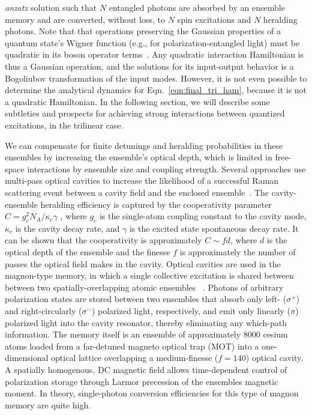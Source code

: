\documentclass[aps,twocolumn,secnumarabic,amsmath,amssymb,pra,groupedaddress,
showpacs, showkeys,draft]{revtex4-1}
\begin{document}
\emph{anzatz} solution such that $N$ entangled photons are absorbed by an
ensemble memory and are converted, without loss, to $N$ spin excitations and
$N$ heralding photons.  Note that that operations preserving the Gaussian
properties of a quantum state's Wigner function (e.g., for
polarization-entangled light) must be quadratic in its boson operator
terms~\cite{RevModPhys.77.513}. Any quadratic interaction Hamiltonian is thus a
Gaussian operation, and the solutions for its input-output behavior is a
Bogoliubov transformation of the input modes. However, it is not even possible
to determine the analytical dynamics for Eqn.~\ref{eqn:final_tri_ham}, because
it is not a quadratic Hamiltonian. In the following section, we will describe
some subtleties and prospects for achieving strong interactions between
quantized excitations, in the trilinear case.

We can compensate for finite detunings and heralding probabilities in these
ensembles by increasing the ensemble's optical depth, which is limited in
free-space interactions by ensemble size and coupling strength. Several
approaches use multi-pass optical cavities to increase the likelihood of a
successful Raman scattering event between a cavity field and the enclosed
ensemble~\cite{PhysRevLett.92.123601, PhysRevLett.95.133601,
  PhysRevLett.98.190503,Thompson07072006,PhysRevLett.98.183601}. The
cavity-ensemble heralding efficiency is captured by the cooperativity parameter
$C=g_c^2 N_A/\kappa_c \gamma$ , where $g_c$ is the single-atom coupling
constant to the cavity mode, $\kappa_c$ is the cavity decay rate, and $\gamma$
is the excited state spontaneous decay rate. It can be shown that the
cooperativity is approximately $C\sim fd$, where $d$ is the optical depth of
the ensemble and the finesse ${f}$ is approximately the number of passes the
optical field makes in the cavity. Optical cavities are used in the magnon-type
memory, in which a single collective excitation is shared between between two
spatially-overlapping atomic ensembles ~\cite{PhysRevLett.103.043601}. Photons
of arbitrary polarization states are stored between two ensembles that absorb
only left- ($\sigma^{+}$) and right-circularly ($\sigma^{-}$) polarized light,
respectively, and emit only linearly ($\pi$) polarized light into the cavity
resonator, thereby eliminating any which-path information. The memory itself is
an ensemble of approximately 8000 cesium atoms loaded from a far-detuned
magneto optical trap (MOT) into a one-dimensional optical lattice overlapping a
medium-finesse ($f=140$) optical cavity. A spatially homogenous, DC magnetic
field allows time-dependent control of polarization storage through Larmor
precession of the ensembles magnetic moment. In theory, single-photon
conversion efficiencies for this type of magnon memory are quite high.
\end{document}
